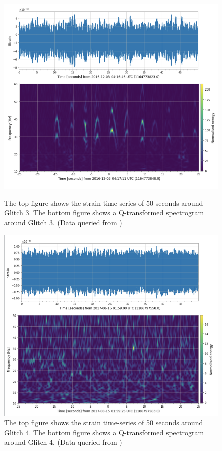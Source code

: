 \documentclass[preprint,
letterpaper,
 amsmath,amssymb,
 aps,
]{revtex4-2}
\begin{document}
 \begin{figure}[!tbp]
  \centering
  \begin{minipage}[b]{0.48\textwidth}
\includegraphics[width=\textwidth]{Scattered Light Graphics.png}
\caption{The top figure shows the strain time-series of 50 seconds around Glitch 3. The bottom figure shows a Q-transformed spectrogram around Glitch 3. (Data queried from \cite{collaboration2019open})}
  \end{minipage}
  \hfill
  \begin{minipage}[b]{0.48\textwidth}
\includegraphics[width=\textwidth]{power line graphics.png}
\caption{The top figure shows the strain time-series of 50 seconds around Glitch 4. The bottom figure shows a Q-transformed spectrogram around Glitch 4. (Data queried from \cite{collaboration2019open})}
  \end{minipage}
\end{figure}
\end{document}
